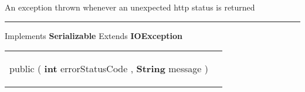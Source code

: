 {\scriptsize An exception thrown whenever an unexpected http status is returned
 
\vspace*{4pt} \hrule \vspace*{3pt}
Implements \textbf{ Serializable }
Extends \textbf{ IOException }
\vspace*{-5pt} 
\begin{tabularx}{\linewidth}{X|m{}}
\label{tab:HTTPException}
\begin{raggedleft}public  \textbf{\hyperref[tab:HTTPException]{\color{blue}{HTTPException}} }(\newline \hfill 
\hspace*{ 5pt} \textbf{int} errorStatusCode , \newline
 \hspace*{ 5pt} \textbf{String} message  )
\end{raggedleft} &
 \\\end{tabularx}
}
